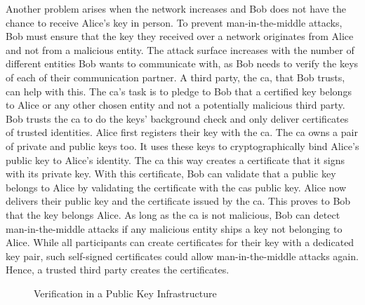 Another problem arises when the network increases and Bob does not have the
chance to receive Alice's key in person. To prevent man-in-the-middle attacks,
Bob must ensure that the key they received over a network originates from Alice
and not from a malicious entity. The attack surface increases with the number of
different entities Bob wants to communicate with, as Bob needs to verify the
keys of each of their communication partner. A third party, the \gls{ca}, that
Bob trusts, can help with this. The \gls{ca}'s task is to pledge to Bob that a
certified key belongs to Alice or any other chosen entity and not a potentially
malicious third party. Bob trusts the \gls{ca} to do the keys' background check
and only deliver certificates of trusted identities. Alice first registers their
key with the \gls{ca}. The \gls{ca} owns a pair of private and public keys too.
It uses these keys to cryptographically bind Alice's public key to Alice's
identity. The \gls{ca} this way creates a certificate that it signs with its
private key. With this certificate, Bob can validate that a public key belongs
to Alice by validating the certificate with the \glspl{ca} public key. Alice now
delivers their public key and the certificate issued by the \gls{ca}. This
proves to Bob that the key belongs Alice. As long as the \gls{ca} is not
malicious, Bob can detect man-in-the-middle attacks if any malicious entity
ships a key not belonging to Alice. While all participants can create
certificates for their key with a dedicated key pair, such self-signed
certificates could allow man-in-the-middle attacks again. Hence, a trusted third
party creates the certificates.\\

\begin{figure}
  \begin{center}
    
    \caption{Verification in a Public Key Infrastructure}
    \label{fig:state:technical:chain_of_trust}
  \end{center}
\end{figure}

